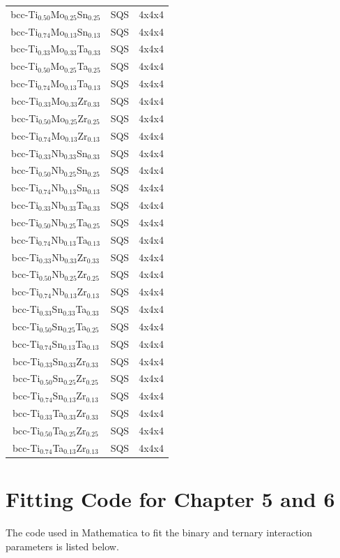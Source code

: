 \begin{longtable}[H]{ c c c }
	bcc-Ti$_{0.50}$Mo$_{0.25}$Sn$_{0.25}$ & SQS & 4x4x4\\
	bcc-Ti$_{0.74}$Mo$_{0.13}$Sn$_{0.13}$ & SQS & 4x4x4\\
	bcc-Ti$_{0.33}$Mo$_{0.33}$Ta$_{0.33}$ & SQS & 4x4x4\\
	bcc-Ti$_{0.50}$Mo$_{0.25}$Ta$_{0.25}$ & SQS & 4x4x4\\
	bcc-Ti$_{0.74}$Mo$_{0.13}$Ta$_{0.13}$ & SQS & 4x4x4\\
	bcc-Ti$_{0.33}$Mo$_{0.33}$Zr$_{0.33}$ & SQS & 4x4x4\\
	bcc-Ti$_{0.50}$Mo$_{0.25}$Zr$_{0.25}$ & SQS & 4x4x4\\
	bcc-Ti$_{0.74}$Mo$_{0.13}$Zr$_{0.13}$ & SQS & 4x4x4\\
	bcc-Ti$_{0.33}$Nb$_{0.33}$Sn$_{0.33}$ & SQS & 4x4x4\\
	bcc-Ti$_{0.50}$Nb$_{0.25}$Sn$_{0.25}$ & SQS & 4x4x4\\
	bcc-Ti$_{0.74}$Nb$_{0.13}$Sn$_{0.13}$ & SQS & 4x4x4\\
	bcc-Ti$_{0.33}$Nb$_{0.33}$Ta$_{0.33}$ & SQS & 4x4x4\\
	bcc-Ti$_{0.50}$Nb$_{0.25}$Ta$_{0.25}$ & SQS & 4x4x4\\
	bcc-Ti$_{0.74}$Nb$_{0.13}$Ta$_{0.13}$ & SQS & 4x4x4\\
	bcc-Ti$_{0.33}$Nb$_{0.33}$Zr$_{0.33}$ & SQS & 4x4x4\\
	bcc-Ti$_{0.50}$Nb$_{0.25}$Zr$_{0.25}$ & SQS & 4x4x4\\
	bcc-Ti$_{0.74}$Nb$_{0.13}$Zr$_{0.13}$ & SQS & 4x4x4\\
	bcc-Ti$_{0.33}$Sn$_{0.33}$Ta$_{0.33}$ & SQS & 4x4x4\\
	bcc-Ti$_{0.50}$Sn$_{0.25}$Ta$_{0.25}$ & SQS & 4x4x4\\
	bcc-Ti$_{0.74}$Sn$_{0.13}$Ta$_{0.13}$ & SQS & 4x4x4\\
	bcc-Ti$_{0.33}$Sn$_{0.33}$Zr$_{0.33}$ & SQS & 4x4x4\\
	bcc-Ti$_{0.50}$Sn$_{0.25}$Zr$_{0.25}$ & SQS & 4x4x4\\
	bcc-Ti$_{0.74}$Sn$_{0.13}$Zr$_{0.13}$ & SQS & 4x4x4\\
	bcc-Ti$_{0.33}$Ta$_{0.33}$Zr$_{0.33}$ & SQS & 4x4x4\\
	bcc-Ti$_{0.50}$Ta$_{0.25}$Zr$_{0.25}$ & SQS & 4x4x4\\
	bcc-Ti$_{0.74}$Ta$_{0.13}$Zr$_{0.13}$ & SQS & 4x4x4\\
\end{longtable}
\clearpage

\section*{Fitting Code for Chapter 5 and 6}
The code used in Mathematica to fit the binary and ternary interaction parameters is listed below.

